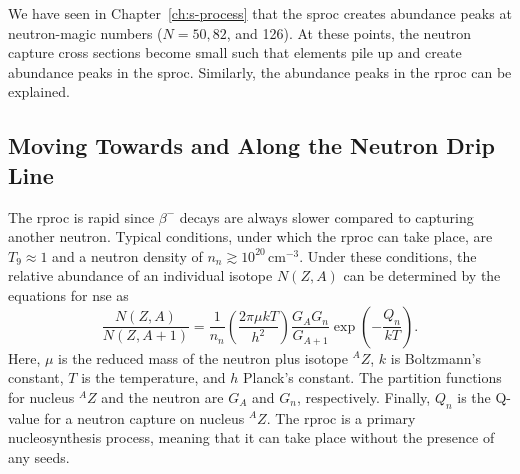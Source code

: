 We have seen in Chapter~\ref{ch:s-process} that the \ac{sproc} creates abundance peaks at neutron-magic numbers ($N=50, 82$, and 126). At these points, the neutron capture cross sections become small such that elements pile up and create abundance peaks in the \ac{sproc}. Similarly, the abundance peaks in the \ac{rproc} can be explained.

\subsection{Moving Towards and Along the Neutron Drip Line}

The \ac{rproc} is rapid since $\beta^{-}$ decays are always slower compared to capturing another neutron. Typical conditions, under which the \ac{rproc} can take place, are $T_9 \approx 1$ and a neutron density of $n_n \gtrsim 10^{20}\,\mathrm{cm}^{-3}$. Under these conditions, the relative abundance of an individual isotope $N(Z,A)$ can be determined by the equations for \acl{nse} as
\begin{equation}
    \frac{N(Z,A)}{N(Z,A+1)} = \frac{1}{n_n} \left(\frac{2\pi\mu kT}{h^2}\right) \frac{G_A G_n}{G_{A+1}} \exp\left(-\frac{Q_n}{kT}\right).
\end{equation}
Here, $\mu$ is the reduced mass of the neutron plus isotope ${^A}Z$, $k$ is Boltzmann's constant, $T$ is the temperature, and $h$ Planck's constant. The partition functions for nucleus ${^A}Z$ and the neutron are $G_A$ and $G_n$, respectively. Finally, $Q_n$ is the Q-value for a neutron capture on nucleus $^{A}Z$. The \ac{rproc} is a primary nucleosynthesis process, meaning that it can take place without the presence of any seeds.

